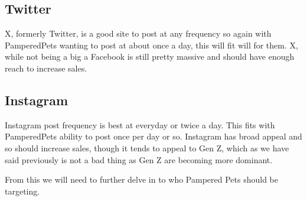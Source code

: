 \documentclass{article}
\begin{document}
 \subsection{Twitter}
 X, formerly Twitter, is a good site to post at any frequency so again with PamperedPets wanting to post at about once a day, this will fit will for them.
X, while not being a big a Facebook is still pretty massive and should have enough reach to increase sales.

 \subsection{Instagram}
 Instagram post frequency is best at everyday or twice a day. This fits with PamperedPets ability to post once per day or so.
Instagram has broad appeal and so should increase sales, though it tends to appeal to Gen Z, which as we have said previously is not a bad thing as Gen Z are becoming more dominant.

 From this we will need to further delve in to who Pampered Pets should be targeting.


\end{document}
